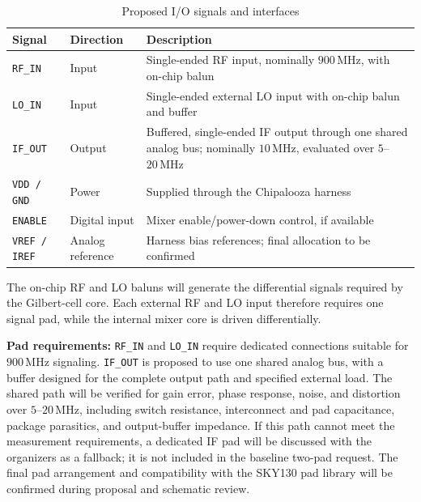 \documentclass[11pt,letterpaper]{article}
\begin{document}
\begin{table}[htbp]
\centering
\caption{Proposed I/O signals and interfaces}
\label{tab:io}
\begin{tabularx}{\textwidth}{@{}llY@{}}
\toprule
\textbf{Signal} &
\textbf{Direction} &
\textbf{Description} \\
\midrule

\texttt{RF\_IN} &
Input &
Single-ended RF input, nominally
\(900\,\mathrm{MHz}\), with on-chip balun \\

\texttt{LO\_IN} &
Input &
Single-ended external LO input with on-chip balun and buffer \\

\texttt{IF\_OUT} &
Output &
Buffered, single-ended IF output through one shared analog bus; nominally \(10\,\mathrm{MHz}\), evaluated over \(5\)--\(20\,\mathrm{MHz}\) \\

\texttt{VDD / GND} &
Power &
Supplied through the Chipalooza harness \\

\texttt{ENABLE} &
Digital input &
Mixer enable/power-down control, if available \\

\texttt{VREF / IREF} &
Analog reference &
Harness bias references; final allocation to be confirmed \\

\bottomrule
\end{tabularx}
\end{table}

The on-chip RF and LO baluns will generate the differential signals required by the Gilbert-cell core.
Each external RF and LO input therefore requires one signal pad, while the internal mixer core is driven differentially.

\textbf{Pad requirements:}
\texttt{RF\_IN} and \texttt{LO\_IN} require dedicated connections suitable for \(900\,\mathrm{MHz}\) signaling.
\texttt{IF\_OUT} is proposed to use one shared analog bus, with a buffer designed for the complete output path and specified external load.
The shared path will be verified for gain error, phase response, noise, and distortion over \(5\)--\(20\,\mathrm{MHz}\), including switch resistance, interconnect and pad capacitance, package parasitics, and output-buffer impedance.
If this path cannot meet the measurement requirements, a dedicated IF pad will be discussed with the organizers as a fallback; it is not included in the baseline two-pad request.
The final pad arrangement and compatibility with the SKY130 pad library will be confirmed during proposal and schematic review.
\end{document}
